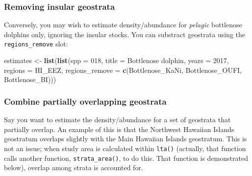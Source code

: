 \documentclass[
]{book}
\newenvironment{Shaded}{\begin{snugshade}}{\end{snugshade}}
\newcommand{\AttributeTok}[1]{\textcolor[rgb]{0.13,0.29,0.53}{#1}}
\newcommand{\DecValTok}[1]{\textcolor[rgb]{0.00,0.00,0.81}{#1}}
\newcommand{\FunctionTok}[1]{\textcolor[rgb]{0.13,0.29,0.53}{\textbf{#1}}}
\newcommand{\NormalTok}[1]{#1}
\newcommand{\OtherTok}[1]{\textcolor[rgb]{0.56,0.35,0.01}{#1}}
\newcommand{\StringTok}[1]{\textcolor[rgb]{0.31,0.60,0.02}{#1}}
\begin{document}
\hypertarget{removing-insular-geostrata}{%
\subsubsection*{Removing insular geostrata}\label{removing-insular-geostrata}}

Conversely, you may wish to estimate density/abundance for \emph{pelagic} bottlenose dolphins only, ignoring the insular stocks. You can substract geostrata using the \texttt{regions\_remove} slot:

\begin{Shaded}
\begin{Highlighting}[]
\NormalTok{estimates }\OtherTok{\textless{}{-}} \FunctionTok{list}\NormalTok{(}\FunctionTok{list}\NormalTok{(}\AttributeTok{spp =} \StringTok{\textquotesingle{}018\textquotesingle{}}\NormalTok{,}
                       \AttributeTok{title =} \StringTok{\textquotesingle{}Bottlenose dolphin\textquotesingle{}}\NormalTok{,}
                       \AttributeTok{years =} \DecValTok{2017}\NormalTok{,}
                       \AttributeTok{regions =} \StringTok{\textquotesingle{}HI\_EEZ\textquotesingle{}}\NormalTok{,}
                       \AttributeTok{regions\_remove =} \FunctionTok{c}\NormalTok{(}\StringTok{\textquotesingle{}Bottlenose\_KaNi\textquotesingle{}}\NormalTok{,}
                                          \StringTok{\textquotesingle{}Bottlenose\_OUFI\textquotesingle{}}\NormalTok{,}
                                          \StringTok{\textquotesingle{}Bottlenose\_BI\textquotesingle{}}\NormalTok{)))}
\end{Highlighting}
\end{Shaded}

\hypertarget{combine-partially-overlapping-geostrata}{%
\subsubsection*{Combine partially overlapping geostrata}\label{combine-partially-overlapping-geostrata}}

Say you want to estimate the density/abundance for a set of geostrata that partially overlap. An example of this is that the Northwest Hawaiian Islands geostratum overlaps slightly with the Main Hawaiian Islands geostratum. This is not an issue; when study area is calculated within \texttt{lta()} (actually, that function calls another function, \texttt{strata\_area()}, to do this. That function is demonstrated below), overlap among strata is accounted for.
\end{document}
